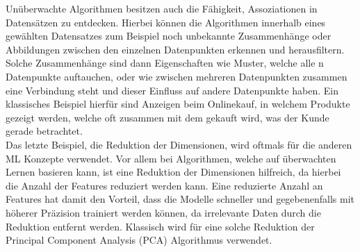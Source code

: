 \documentclass[]{iat}
\begin{document}
Unüberwachte Algorithmen besitzen auch die Fähigkeit, Assoziationen in Datensätzen zu entdecken. Hierbei können die Algorithmen innerhalb eines gewählten Datensatzes zum Beispiel noch unbekannte Zusammenhänge oder Abbildungen zwischen den einzelnen Datenpunkten erkennen und herausfiltern. Solche Zusammenhänge sind dann Eigenschaften wie Muster, welche alle n Datenpunkte auftauchen, oder wie zwischen mehreren Datenpunkten zusammen eine Verbindung steht und dieser Einfluss auf andere Datenpunkte haben. Ein klassisches Beispiel hierfür sind Anzeigen beim Onlinekauf, in welchem Produkte gezeigt werden, welche oft zusammen mit dem gekauft wird, was der Kunde gerade betrachtet.\\
Das letzte Beispiel, die Reduktion der Dimensionen, wird oftmals für die anderen ML Konzepte verwendet. Vor allem bei Algorithmen, welche auf überwachten Lernen basieren kann, ist eine Reduktion der Dimensionen hilfreich, da hierbei die Anzahl der Features reduziert werden kann. Eine reduzierte Anzahl an Features hat damit den Vorteil, dass die Modelle schneller und gegebenenfalls mit höherer Präzision trainiert werden können, da irrelevante Daten durch die Reduktion entfernt werden. Klassisch wird für eine solche Reduktion der Principal Component Analysis (PCA) Algorithmus verwendet. \cite[]{murphy2012machine} \cite[]{FrocMasc2021}
\end{document}
